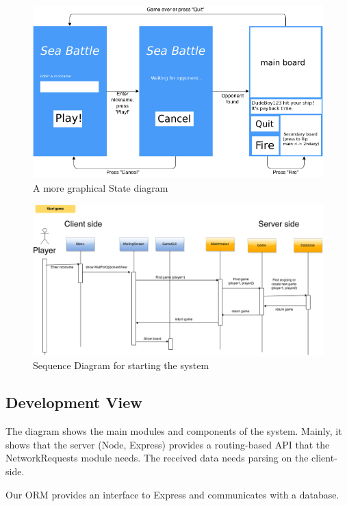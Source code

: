 \begin{figure}[H]
  \centering
    \includegraphics[width=\textwidth]{figs/gui_state_diagram.png}
  \caption{A more graphical State diagram}
\end{figure}


\begin{figure}[H]
  \centering
    \includegraphics[width=\textwidth]{figs/sequence_diagram.png}
  \caption{Sequence Diagram for starting the system}
\end{figure}


\subsection{Development View}
\label{developmentview}

The diagram shows the main modules and components of the system. Mainly, it shows that the server (Node, Express) provides a routing-based API that the NetworkRequests module needs. The received data needs parsing on the client-side. 

Our ORM provides an interface to Express and communicates with a database.

